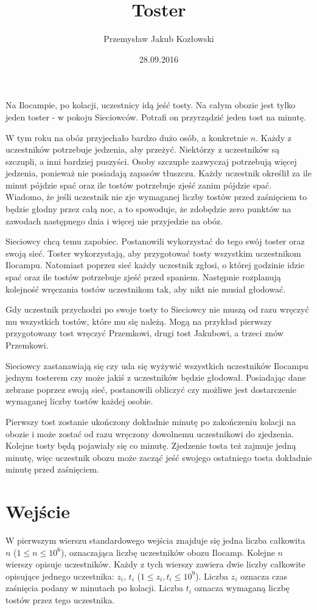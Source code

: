 \documentclass[zad,zawodnik,utf8]{sinol}
\title{Toster}
\author{Przemysław Jakub Kozłowski} %
\date{28.09.2016}
\begin{document}
\begin{tasktext}%
Na Ilocampie, po kolacji, uczestnicy idą jeść tosty. Na całym obozie jest tylko jeden toster - w pokoju Sieciowców. Potrafi on przyrządzić jeden tost na minutę.

W tym roku na obóz przyjechało bardzo dużo osób, a konkretnie $n$. Każdy z uczestników potrzebuje jedzenia, aby przeżyć. Niektórzy z uczestników są szczupli, a inni bardziej puszyści. Osoby szczupłe zazwyczaj potrzebują więcej jedzenia, ponieważ nie posiadają zapasów tłuszczu. Każdy uczestnik określił za ile minut pójdzie spać oraz ile tostów potrzebuje zjeść zanim pójdzie spać. Wiadomo, że jeśli uczestnik nie zje wymaganej liczby tostów przed zaśnięciem to będzie głodny przez całą noc, a to spowoduje, że zdobędzie zero punktów na zawodach następnego dnia i więcej nie przyjedzie na obóz.

Sieciowcy chcą temu zapobiec. Postanowili wykorzystać do tego swój toster oraz swoją sieć. Toster wykorzystają, aby przygotować tosty wszystkim uczestnikom Ilocampu. Natomiast poprzez sieć każdy uczestnik zgłosi, o której godzinie idzie spać oraz ile tostów potrzebuje zjeść przed spaniem. Następnie rozplanują kolejność wręczania tostów uczestnikom tak, aby nikt nie musiał głodować.

Gdy uczestnik przychodzi po swoje tosty to Sieciowcy nie muszą od razu wręczyć mu wszystkich tostów, które mu się należą. Mogą na przykład pierwszy przygotowany tost wręczyć Przemkowi, drugi tost Jakubowi, a trzeci znów Przemkowi.

Sieciowcy zastanawiają się czy uda się wyżywić wszystkich uczestników Ilocampu jednym tosterem czy może jakiś z uczestników będzie głodował. Posiadając dane zebrane poprzez swoją sieć, postanowili obliczyć czy możliwe jest dostarczenie wymaganej liczby tostów każdej osobie.

Pierwszy tost zostanie ukończony dokładnie minutę po zakończeniu kolacji na obozie i może zostać od razu wręczony dowolnemu uczestnikowi do zjedzenia. Kolejne tosty będą pojawiały się co minutę. Zjedzenie tosta też zajmuje jedną minutę, więc uczestnik obozu może zacząć jeść swojego ostatniego tosta dokładnie minutę przed zaśnięciem.

  \section{Wejście}
W pierwszym wierszu standardowego wejścia znajduje się jedna liczba całkowita $n$ ($1 \leq n \leq 10^6$), oznaczająca liczbę uczestników obozu Ilocamp. Kolejne $n$ wierszy opisuje uczestników. Każdy z tych wierszy zawiera dwie liczby całkowite opisujące jednego uczestnika: $z_i$, $t_i$ ($1 \leq z_i, t_i \leq 10^9$). Liczba $z_i$ oznacza czas zaśnięcia podany w minutach po kolacji. Liczba $t_i$ oznacza wymaganą liczbę tostów przez tego uczestnika.


\end{tasktext}
\end{document}
